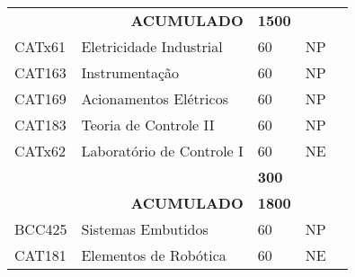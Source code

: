 \begin{table}[]
{\begin{tabular}{l|l|l|l|l}
			\multicolumn{1}{|l|}{}                              & \multicolumn{1}{r|}{\textbf{ACUMULADO}}                  & \textbf{1500}                                                &                         &  \\ \cline{1-4}
			\multicolumn{1}{|l|}{CATx61}                        & Eletricidade Industrial                                  & 60                                                           & NP                      &  \\ \cline{1-4}
			\multicolumn{1}{|l|}{CAT163}                        & Instrumentação                                           & 60                                                           & NP                      &  \\ \cline{1-4}
			\multicolumn{1}{|l|}{CAT169}                        & Acionamentos Elétricos                                   & 60                                                           & NP                      &  \\ \cline{1-4}
			\multicolumn{1}{|l|}{CAT183}                        & Teoria de Controle II                                    & 60                                                           & NP                      &  \\ \cline{1-4}
			\multicolumn{1}{|l|}{CATx62}                        & Laboratório de Controle I                                & 60                                                           & NE                      &  \\ \cline{1-4}
			\multicolumn{1}{|l|}{}                              &                                                          & \textbf{300}                                                 &                         &  \\ \cline{1-4}
			\multicolumn{1}{|l|}{}                              & \multicolumn{1}{r|}{\textbf{ACUMULADO}}                  & \textbf{1800}                                                &                         &  \\ \cline{1-4}
			BCC425                                              & Sistemas Embutidos                                       & 60                                                           & NP                      &  \\ \cline{1-4}
			\multicolumn{1}{|l|}{CAT181}                        & Elementos de Robótica                                    & 60                                                           & NE                      &  \\ \cline{1-4}

\end{tabular}}
\end{table}
